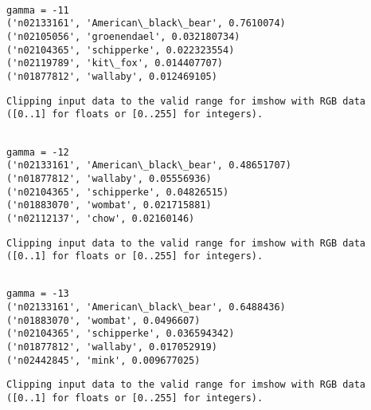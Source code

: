 \documentclass[11pt]{article}
\begin{document}
    \begin{Verbatim}[commandchars=\\\{\}]

gamma = -11
('n02133161', 'American\_black\_bear', 0.7610074)
('n02105056', 'groenendael', 0.032180734)
('n02104365', 'schipperke', 0.022323554)
('n02119789', 'kit\_fox', 0.014407707)
('n01877812', 'wallaby', 0.012469105)

    \end{Verbatim}

    \begin{Verbatim}[commandchars=\\\{\}]
Clipping input data to the valid range for imshow with RGB data ([0..1] for floats or [0..255] for integers).

    \end{Verbatim}

    \begin{Verbatim}[commandchars=\\\{\}]

gamma = -12
('n02133161', 'American\_black\_bear', 0.48651707)
('n01877812', 'wallaby', 0.05556936)
('n02104365', 'schipperke', 0.04826515)
('n01883070', 'wombat', 0.021715881)
('n02112137', 'chow', 0.02160146)

    \end{Verbatim}

    \begin{Verbatim}[commandchars=\\\{\}]
Clipping input data to the valid range for imshow with RGB data ([0..1] for floats or [0..255] for integers).

    \end{Verbatim}

    \begin{Verbatim}[commandchars=\\\{\}]

gamma = -13
('n02133161', 'American\_black\_bear', 0.6488436)
('n01883070', 'wombat', 0.0496607)
('n02104365', 'schipperke', 0.036594342)
('n01877812', 'wallaby', 0.017052919)
('n02442845', 'mink', 0.009677025)

    \end{Verbatim}

    \begin{Verbatim}[commandchars=\\\{\}]
Clipping input data to the valid range for imshow with RGB data ([0..1] for floats or [0..255] for integers).

    \end{Verbatim}
\end{document}
